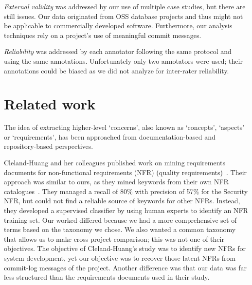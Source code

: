 \documentclass[]{sig-alternate}
\begin{document}
\emph{External validity} was addressed by our use of multiple case studies, but there are still issues. 
Our data originated from OSS database projects and thus might not be applicable to commercially developed software. 
Furthermore, our analysis techniques rely on a project's use of meaningful commit messages. 

\emph{Reliability} was addressed by each annotator following the same protocol and using the same annotations. 
Unfortunately only two annotators were used; their annotations could be biased as we did not analyze for inter-rater reliability.

\section{Related work}
\label{sec:related}

The idea of extracting higher-level `concerns', also known as `concepts', `aspects' or `requirements', has been approached from documentation-based and repository-based perspectives.

Cleland-Huang and her colleagues published work on mining requirements documents for non-functional requirements (NFR) (quality requirements)~\cite{Cleland-Huang2006}. 
Their approach was similar to ours, as they mined keywords from their own NFR catalogues~\cite{chung99}.
They managed a recall of 80\% with precision of 57\% for the Security NFR, but could not find a reliable source of keywords for other NFRs. 
Instead, they developed a supervised classifier by using human experts to identify an NFR training set. 
Our worked differed because we had a more comprehensive set of terms based on the taxonomy we chose.
We also wanted a common taxonomy that allows us to make cross-project comparison; this was not one of their objectives.
The objective of Cleland-Huang's study was to identify new NFRs for system development, yet our objective was to recover those latent NFRs from commit-log messages of the project. 
Another difference was that our data was far less structured than the requirements documents used in their study.
\end{document}
